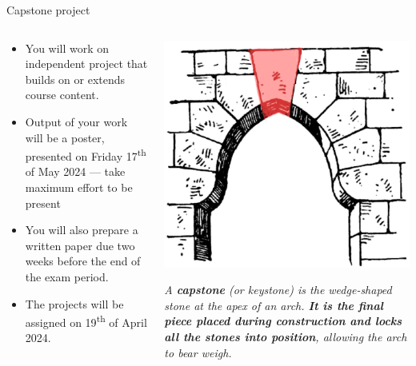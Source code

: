 \begin{frame}{Capstone project}
\begin{columns}
    \begin{column}{0.55\textwidth}
        \begin{itemize}
            \item You will work on independent project that builds on or extends course content.  
            \item Output of your work will be a poster, presented on Friday 17\textsuperscript{th} of May 2024 --- take maximum effort to be present
            \item You will also prepare a written paper due two weeks before the end of the exam period. 
            \item The projects will be assigned on 19\textsuperscript{th} of April 2024.
        \end{itemize}
    \end{column}
    \begin{column}{0.45\textwidth}
    \footnotesize
    \begin{center}
        \includegraphics[scale = 0.75]{lesson_1/images/capstone.png} 
        \end{center}
    \vspace{1em}
       \textit{ A  \textbf{capstone} (or keystone) is the wedge-shaped stone at the apex of an arch. \textbf{It is the final piece placed during construction and locks all the stones into position}, allowing the arch to bear weigh.}
 
    \end{column}
\end{columns}
    
\end{frame}


